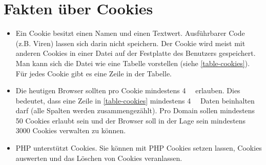\section{Fakten über Cookies}

\begin{itemize}
\item Ein Cookie besitzt einen Namen und einen Textwert. Ausführbarer Code (z.B. Viren) lassen sich darin nicht speichern. Der Cookie wird meist mit anderen Cookies in einer Datei auf der Festplatte des Benutzers gespeichert. Man kann sich die Datei wie eine Tabelle vorstellen (siehe \autoref{table-cookies}). Für jedes Cookie gibt es eine Zeile in der Tabelle.

\begin{table}[htb]
\caption{Vereinfachte Darstellung einer Datei die Cookies speichert.}
\label{table-cookies}
\end{table}

\item Die heutigen Browser sollten pro Cookie mindestens \qty{4}{\kibi\byte} erlauben. Dies bedeutet, dass eine Zeile in \autoref{table-cookies} mindestens \qty{4}{\kibi\byte} Daten beinhalten darf (alle Spalten werden zusammengezählt). Pro Domain sollen mindestens \num{50} Cookies erlaubt sein und der Browser soll in der Lage sein mindestens \num{3000} Cookies verwalten zu können.
\item \ac{PHP} unterstützt Cookies. Sie können mit \ac{PHP} Cookies setzen lassen, Cookies auswerten und das Löschen von Cookies veranlassen.
\end{itemize}

